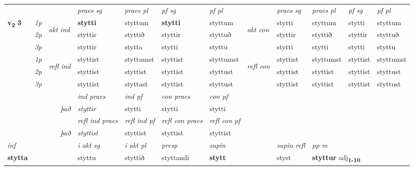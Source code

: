 \begin{longtable}[l]{X>{\footnotesize\itshape}llXXXXlXXXX}
 & &   & \textit{praes sg}  & \textit{praes pl}    & \textit{ pf sg} & \textit{pf pl} & & \textit{praes sg}  & \textit{praes pl}    & \textit{pf sg} & \textit{pf pl }  \\ \cmidrule{4-7} \cmidrule{9-12}
 \multirow{2}{*}{{{\textbf{v{\textsubscript{2}}} \Large{\textbf{3}}}}}  & 1p & \multirow{3}{*}{\begin{turn}{90}\textit{akt ind}\end{turn}} & \textbf{stytti} & styttum & \textbf{stytti} & styttum & \multirow{3}{*}{\begin{turn}{90}\textit{akt con}\end{turn}} &stytti & styttum & stytti & styttum\\*
 & 2p &  &  styttir  & styttið & styttir & styttuð & & styttir & styttið & styttir & styttuð \\*
 & 3p &  & styttir & stytta & stytti & styttu & & stytti & stytti& stytti & styttu \\*
\cmidrule{4-7} \cmidrule{9-12}
 & 1p & \multirow{3}{*}{\begin{turn}{90}\textit{refl ind}\end{turn}}  & styttist & styttumst & styttist & styttumst & \multirow{3}{*}{\begin{turn}{90}\textit{refl con}\end{turn}}  &styttist & styttumst & styttist & styttumst \\*
 & 2p &  & styttist & styttist & styttist & styttust & &styttist & styttist & styttist & styttust \\*
 & 3p  & & styttist & styttast & styttist & styttust & & styttist & styttist& styttist & styttust \\*
\cmidrule{4-7} \cmidrule{9-12}

   && &  \textit{ind praes} & \textit{ind pf} & \textit{con praes} & \textit{con pf} \\*
\multicolumn{3}{r}{\textit{það}} & styttir & stytti & stytti & stytti \\*

\cmidrule{4-7}
 & && \textit{refl ind praes} & \textit{refl ind pf} & \textit{refl con praes} & \textit{refl con pf} \\*
\multicolumn{3}{r}{\textit{það}}& styttist & styttist & styttist & styttist \\*

\cmidrule{4-7}
   {\textit{inf}} & &  & \textit{i akt sg} & \textit{i akt pl}   & \textit{presp} & \textit{supin} && \textit{supin refl} & \textit{pp m} \\*
  {\textbf{stytta}} & && styttu  & styttið   & styttandi &  \textbf{stytt} && styst & \multicolumn{2}{l}{\textbf{styttur} adj\textbf{\textsubscript{1-10}}} \\*


\end{longtable}
